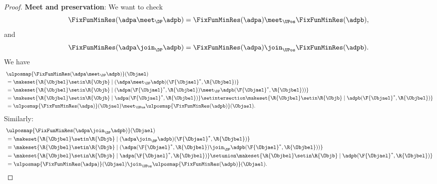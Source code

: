\begin{proof}
    \textbf{Meet and  preservation}:
    We want to check
    \begin{equation}
        \FixFunMinRes(\adpa \meet_\DP \adpb)=\FixFunMinRes(\adpa) \meet_\UPos \FixFunMinRes(\adpb),
    \end{equation}
    and
    \begin{equation}
        \FixFunMinRes(\adpa \join_\DP \adpb)=\FixFunMinRes(\adpa) \join_\UPos \FixFunMinRes(\adpb).
    \end{equation}
    We have
    \begin{equation}
        \begin{aligned}
            ~ &
            \ulposmap{\FixFunMinRes(\adpa \meet_\DP \adpb)}(\Objael) \\
              & =\makeset{ \R{\Objbel} \setin \R{\Objb} \mid (\adpa \meet_\DP \adpb)(\F{\Objael}^*,\R{\Objbel})} \\
              & =\makeset{ \R{\Objbel} \setin \R{\Objb} \mid (\adpa(\F{\Objael}^*,\R{\Objbel})\meet_\DP \adpb(\F{\Objael}^*,\R{\Objbel}))} \\
              & =\makeset{ \R{\Objbel} \setin \R{\Objb} \mid \adpa(\F{\Objael}^*,\R{\Objbel})} \setintersection \makeset{ \R{\Objbel} \setin \R{\Objb} \mid  \adpb(\F{\Objael}^*,\R{\Objbel})} \\
              & =\ulposmap{\FixFunMinRes(\adpa)}(\Objael) \meet_\UPos \ulposmap{\FixFunMinRes(\adpb)}(\Objael).
        \end{aligned}
    \end{equation}
    Similarly:
    \begin{equation}
        \begin{aligned}
            ~ & \ulposmap{\FixFunMinRes(\adpa \join_\DP \adpb)}(\Objael) \\
              & =\makeset{ \R{\Objbel} \setin \R{\Objb} \mid (\adpa \join_\DP \adpb)(\F{\Objael}^*,\R{\Objbel})} \\
              & =\makeset{ \R{\Objbel} \setin \R{\Objb} \mid (\adpa(\F{\Objael}^*,\R{\Objbel})\join_\DP \adpb(\F{\Objael}^*,\R{\Objbel}))} \\
              & =\makeset{ \R{\Objbel} \setin \R{\Objb} \mid \adpa(\F{\Objael}^*,\R{\Objbel})} \setunion \makeset{ \R{\Objbel} \setin \R{\Objb} \mid  \adpb(\F{\Objael}^*,\R{\Objbel})} \\
              & =\ulposmap{\FixFunMinRes(\adpa)}(\Objael) \join_\UPos \ulposmap{\FixFunMinRes(\adpb)}(\Objael).
        \end{aligned}
    \end{equation}


\end{proof}

